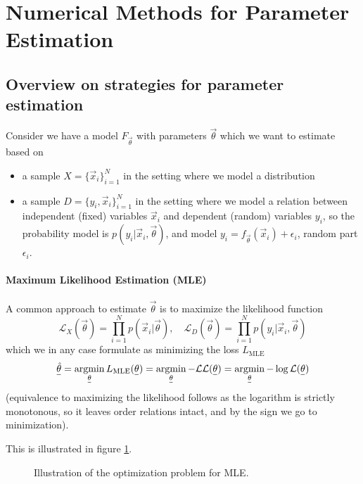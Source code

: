 \section{Numerical Methods for Parameter Estimation}
\thispagestyle{plain}

\subsection{Overview on strategies for parameter estimation}
Consider we have a model $F_\vec{\theta}$ with parameters $\vec{\theta}$ which 
we want to estimate based on

\begin{itemize}
    \item a sample $X = \{\vec{x}_i \}_{i=1}^N$ in the setting where we model a distribution
    \item a sample $D = \{y_i, \vec{x}_i \}_{i=1}^N$ in the setting where we model a relation
    between independent (fixed) variables $\vec{x}_i$ and dependent (random) variables $y_i$,
    so the probability model is $p(y_i | \vec{x}_i, \vec{\theta})$, and model $y_i = f_\vec{\theta}(\vec{x}_i) + 
    \epsilon_i$, random part $\epsilon_i$.
\end{itemize}

\paragraph*{Maximum Likelihood Estimation (MLE)} A common approach to estimate $\vec{\theta}$
is to maximize the likelihood function
\begin{equation}
    \mathcal{L}_X(\vec{\theta}) = \prod_{i=1}^N p(\vec{x}_i | \vec{\theta}), \quad \mathcal{L}_D(\vec{\theta}) = \prod_{i=1}^N p(y_i | \vec{x}_i, \vec{\theta})
\end{equation}
which we in any case formulate as minimizing the loss $L_\text{MLE}$
\begin{equation}
    \vec{\hat{\theta}} = \argmin_{\vec{\theta}} L_\text{MLE}(\vec{\theta}) = \argmin_{\vec{\theta}} -\mathcal{LL}(\vec{\theta}) = \argmin_{\vec{\theta}} -\log \mathcal{L}(\vec{\theta})
\end{equation}
(equivalence to maximizing the likelihood follows as the logarithm is strictly monotonous, so it leaves order relations intact, and by the sign we go to minimization).

This is illustrated in figure \ref{fig:mle_opt}.

\begin{figure}[!htb]
    \centering
    
    \caption{Illustration of the optimization problem for MLE.}
    \label{fig:mle_opt}
\end{figure}

